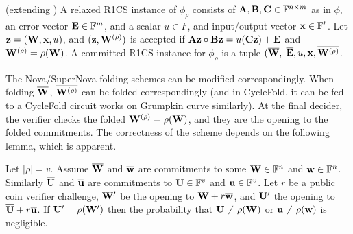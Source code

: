 \begin{definition} (extending \cite[Definition 12]{Nova})
\label{def:extr1cs}
A relaxed R1CS instance of $\phi_\rho$ consists
of ${{\mathbf {A}}},{{\mathbf {B}}},{{\mathbf {C}}} \in \mathbb{F}^{n\times m}$ as in $\phi$,
an error vector ${{\mathbf {E}}} \in \mathbb{F}^m$, and a scalar $u\in F$,
and input/output vector ${{\mathbf {x}}} \in \mathbb{F}^{\ell}$.
Let ${{\mathbf {z}}} = ({{\mathbf {W}}}, {{\mathbf {x}}}, u)$, and
$({{\mathbf {z}}}, {{\mathbf {W^{(\rho)}}}})$ 
is accepted if ${{\mathbf {A}}}{{\mathbf {z}}} \circ {{\mathbf {B}}}{{\mathbf {z}}} 
= u({{\mathbf {C}}}{{\mathbf {z}}}) + {{\mathbf {E}}}$
and ${{\mathbf {W^{(\rho)}}}} = \rho({{\mathbf {W}}})$. 
A committed R1CS instance for $\phi_\rho$ is a tuple 
$(\overline{{{\mathbf {W}}}},$
$\overline{{{\mathbf {E}}}}, u, {{\mathbf {x}}}, \overline{{{\mathbf {W^{(\rho)}}}}}$.
\end{definition}

The Nova/SuperNova folding schemes can be modified correspondingly.
When folding $\overline{{{\mathbf {W}}}}$, $\overline{{{\mathbf {W^{(\rho)}}}}}$ 
can be folded correspondingly (and in CycleFold, it can be fed
to a CycleFold circuit works on Grumpkin curve similarly). 
At the final decider, the verifier checks the 
folded ${{\mathbf {W^{(\rho)}}}} = \rho({{\mathbf {W}}})$, 
and they are the opening to the folded commitments.
The correctness of the scheme depends on the following
lemma, which is apparent.

\begin{lemma} Let $|\rho| = v$. Assume
$\overline{{{\mathbf {W}}}}$ and $\overline{{{\mathbf {w}}}}$ are 
commitments to some ${{\mathbf {W}}} \in \mathbb{F}^n$ and ${{\mathbf {w}}} \in \mathbb{F}^n$. Similarly
$\overline{{{\mathbf {U}}}}$ and $\overline{{{\mathbf {u}}}}$ are 
commitments to ${{\mathbf {U}}} \in \mathbb{F}^v$ and
${{\mathbf {u}}} \in \mathbb{F}^v$. 
Let $r$ be a public coin verifier challenge,
${{\mathbf {W'}}}$ be the opening to 
$\overline{{{\mathbf {W}}}} + r\overline{{{\mathbf {w}}}}$,
and ${{\mathbf {U'}}}$ the opening to 
$\overline{{{\mathbf {U}}}} + r\overline{{{\mathbf {u}}}}$.
If ${{\mathbf {U'}}} = \rho({{\mathbf {W'}}})$ then the probability that
${{\mathbf {U}}} \neq \rho({{\mathbf {W}}})$ or ${{\mathbf {u}}} \neq \rho({{\mathbf {w}}})$ 
is negligible.
\end{lemma}

